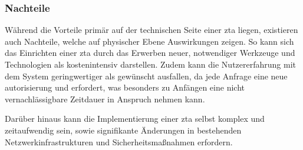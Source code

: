 \subsubsection{Nachteile}\label{subsubsec:nachteile}
Während die Vorteile primär auf der technischen Seite einer \ac{zta} liegen, existieren auch Nachteile, welche auf physischer Ebene Auswirkungen zeigen.
So kann sich das Einrichten einer \ac{zta} durch das Erwerben neuer, notwendiger Werkzeuge und Technologien als kostenintensiv darstellen.\autocite[\vglf][]{shore-2021}
Zudem kann die Nutzererfahrung mit dem System geringwertiger als gewünscht ausfallen, da jede Anfrage eine neue \gls{autorisierung} und  erfordert, was besonders zu Anfängen eine nicht vernachlässigbare Zeitdauer in Anspruch nehmen kann.\autocite[\vglf][]{shore-2021}

Darüber hinaus kann die Implementierung einer \ac{zta} selbst komplex und zeitaufwendig sein, sowie signifikante Änderungen in bestehenden Netzwerkinfrastrukturen und Sicherheitsmaßnahmen erfordern.\autocites[\vglf][]{shore-2021}[\vglf][]{buck-2021}